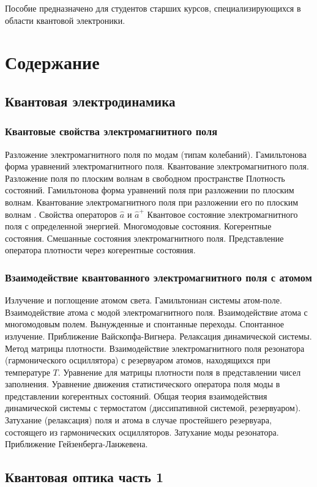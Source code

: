 Пособие предназначено для студентов старших курсов, специализирующихся
в области квантовой электроники. 

\section{Содержание}
\subsection{Квантовая электродинамика}
\subsubsection{Квантовые свойства электромагнитного поля}
Разложение электромагнитного поля по модам (типам колебаний).
Гамильтонова форма уравнений электромагнитного поля.
Квантование электромагнитного поля.
Разложение поля по плоским волнам в свободном пространстве 
Плотность состояний.
Гамильтонова форма уравнений поля при разложении по плоским
волнам.
Квантование электромагнитного поля при разложении его по
плоским волнам .
Свойства операторов $ \hat a $ и $ \hat a ^+ $ 
Квантовое состояние электромагнитного поля  с определенной
  энергией.
Многомодовые состояния. 
Когерентные состояния.
Смешанные состояния электромагнитного поля.
Представление оператора плотности через когерентные
состояния.
\subsubsection{Взаимодействие квантованного электромагнитного поля с атомом}
Излучение и поглощение атомом света.
Гамильтониан системы атом-поле.
Взаимодействие атома с модой электромагнитного поля.
Взаимодействие атома с многомодовым полем. Вынужденные и
спонтанные переходы.
Спонтанное излучение. Приближение Вайскопфа-Вигнера.
Релаксация динамической системы. Метод матрицы плотности.
Взаимодействие электромагнитного поля резонатора
(гармонического осциллятора) с резервуаром атомов, находящихся при
температуре $T$.
Уравнение для матрицы плотности поля в представлении чисел
заполнения.
Уравнение движения статистического оператора поля моды в
представлении когерентных состояний.
Общая теория взаимодействия динамической системы с
термостатом (диссипативной системой, резервуаром).
Затухание (релаксация) поля и атома в случае простейшего
резервуара, состоящего из гармонических осцилляторов.
Затухание моды резонатора. Приближение Гейзенберга-Ланжевена.

\subsection{Квантовая оптика часть 1}
